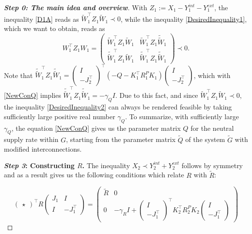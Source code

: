 \documentclass[11pt,a4paper,oneside,DIV=12,headings=small]{scrartcl}
\theoremstyle{plain}
\begin{document}
\begin{proof}[\textbf{Step 0: \textit{The main idea and overview}}]
With $Z_1:=X_1-Y_1^{int}-Y_1^{ext}$, the inequality \eqref{D1A} reads as $\tilde{W}_1^\top Z_1 \tilde{W}_1 \prec 0$, while the inequality \eqref{DesiredInequality1}, which we want to obtain, reads as 
\begin{equation}
\label{DesiredInequality2}
W_1^\top Z_1 W_1= \begin{pmatrix} \tilde{W}_1^\top Z_1 \tilde{W}_1 & \tilde{W}_1^\top Z_1 \tilde{\tilde{W}}_1 \\ \tilde{\tilde{W}}_1^\top Z_1 \tilde{W}_1 & \tilde{\tilde{W}}_1^\top Z_1 \tilde{\tilde{W}}_1 \end{pmatrix} \prec 0.
\end{equation}
Note that $\tilde{\tilde{W}}_1^\top Z_1 \tilde{\tilde{W}}_1=\left(\begin{smallmatrix} I \\ -J_2^\top \end{smallmatrix}\right)^\top (-Q-K_1^\top R_1^P K_1)\left(\begin{smallmatrix} I \\ -J_2^\top \end{smallmatrix}\right)$, which with \eqref{NewConQ} implies $\tilde{\tilde{W}}_1^\top Z_1 \tilde{\tilde{W}}_1=-\gamma_Q I$. Due to this fact, and since  $\tilde{W}_1^\top Z_1 \tilde{W}_1\prec 0$, the inequality \eqref{DesiredInequality2} can always be rendered feasible by taking sufficiently large positive real number $\gamma_Q$. To summarize, with sufficiently large $\gamma_Q$, the equation \eqref{NewConQ} gives us the parameter matrix $Q$ for the neutral supply rate within $G$, starting from the parameter matrix $\tilde{Q}$ of the system $\tilde{G}$ with modified interconnections.

\medskip

\textbf{\emph{Step 3}: Constructing $R$.} \newline
The inequality $X_2 \prec Y_2^{int}+Y_2^{ext}$ follows by symmetry and as a result gives us the following conditions which relate $R$ with $\tilde{R}$: 

\begin{equation}
\label{NewConR}
\begin{pmatrix} \star \end{pmatrix}^\top 
R
\begin{pmatrix} J_1 & I \\ I & -J_1^\top \end{pmatrix}=
\begin{pmatrix}
\tilde{R} & 0 \\ 0 & -\gamma_R I+\begin{pmatrix} I \\ -J_1^\top \end{pmatrix}^\top K_2^\top R_2^P K_2 \begin{pmatrix} I \\ -J_1^\top \end{pmatrix}
\end{pmatrix}
\end{equation}


\end{proof}
\end{document}
